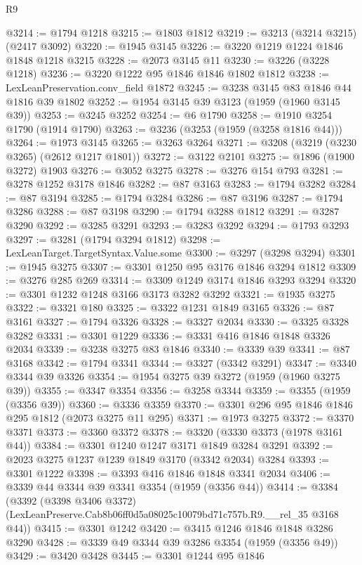 \begin{lexlean}{R9}
\begin{coremodule}
@3214 := @1794 @1218
@3215 := @1803 @1812
@3219 := @3213 (@3214 @3215) (@2417 @3092)
@3220 := @1945 @3145
@3226 := @3220 @1219 @1224 @1846 @1848 @1218 @3215
@3228 := @2073 @3145 @11
@3230 := @3226 (@3228 @1218)
@3236 := @3220 @1222 @95 @1846 @1846 @1802 @1812
@3238 := LexLeanPreservation.conv_field @1872
@3245 := @3238 @3145 @83 @1846 @44 @1816 @39 @1802
@3252 := @1954 @3145 @39 @3123 (@1959 (@1960 @3145 @39))
@3253 := @3245 @3252
@3254 := @6 @1790
@3258 := @1910 @3254 @1790 (@1914 @1790)
@3263 := @3236 (@3253 (@1959 (@3258 @1816 @44)))
@3264 := @1973 @3145
@3265 := @3263 @3264
@3271 := @3208 (@3219 (@3230 @3265) (@2612 @1217 @1801))
@3272 := @3122 @2101
@3275 := @1896 (@1900 @3272) @1903
@3276 := @3052 @3275
@3278 := @3276 @154 @793
@3281 := @3278 @1252 @3178 @1846
@3282 := @87 @3163
@3283 := @1794 @3282
@3284 := @87 @3194
@3285 := @1794 @3284
@3286 := @87 @3196
@3287 := @1794 @3286
@3288 := @87 @3198
@3290 := @1794 @3288 @1812
@3291 := @3287 @3290
@3292 := @3285 @3291
@3293 := @3283 @3292
@3294 := @1793 @3293
@3297 := @3281 (@1794 @3294 @1812)
@3298 := LexLeanTarget.TargetSyntax.Value.some
@3300 := @3297 (@3298 @3294)
@3301 := @1945 @3275
@3307 := @3301 @1250 @95 @3176 @1846 @3294 @1812
@3309 := @3276 @285 @269
@3314 := @3309 @1249 @3174 @1846 @3293 @3294
@3320 := @3301 @1232 @1248 @3166 @3173 @3282 @3292
@3321 := @1935 @3275
@3322 := @3321 @180
@3325 := @3322 @1231 @1849 @3165
@3326 := @87 @3161
@3327 := @1794 @3326
@3328 := @3327 @2034
@3330 := @3325 @3328 @3282
@3331 := @3301 @1229
@3336 := @3331 @416 @1846 @1848 @3326 @2034
@3339 := @3238 @3275 @83 @1846
@3340 := @3339 @39
@3341 := @87 @3168
@3342 := @1794 @3341
@3344 := @3327 (@3342 @3291)
@3347 := @3340 @3344 @39 @3326
@3354 := @1954 @3275 @39 @3272 (@1959 (@1960 @3275 @39))
@3355 := @3347 @3354
@3356 := @3258 @3344
@3359 := @3355 (@1959 (@3356 @39))
@3360 := @3336 @3359
@3370 := @3301 @296 @95 @1846 @1846 @295 @1812 (@2073 @3275 @11 @295)
@3371 := @1973 @3275
@3372 := @3370 @3371
@3373 := @3360 @3372
@3378 := @3320 (@3330 @3373 (@1978 @3161 @44))
@3384 := @3301 @1240 @1247 @3171 @1849 @3284 @3291
@3392 := @2023 @3275 @1237 @1239 @1849 @3170 (@3342 @2034) @3284
@3393 := @3301 @1222
@3398 := @3393 @416 @1846 @1848 @3341 @2034
@3406 := @3339 @44 @3344 @39 @3341 @3354 (@1959 (@3356 @44))
@3414 := @3384
    (@3392
      (@3398 @3406 @3372)
      (LexLeanPreserve.Cab8b06ff0d5a08025c10079bd71c757b.R9.__rel_35 @3168 @44))
@3415 := @3301 @1242
@3420 := @3415 @1246 @1846 @1848 @3286 @3290
@3428 := @3339 @49 @3344 @39 @3286 @3354 (@1959 (@3356 @49))
@3429 := @3420 @3428
@3445 := @3301
    @1244
    @95
    @1846

\end{coremodule}
\end{lexlean}
